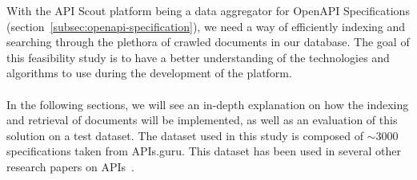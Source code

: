 With the API Scout platform being a data aggregator for OpenAPI Specifications (section~\ref{subsec:openapi-specification}), we need a way of efficiently indexing and searching through the plethora of crawled documents in our database.
The goal of this feasibility study is to have a better understanding of the technologies and algorithms to use during the development of the platform. \\ \\
In the following sections, we will see an in-depth explanation on how the indexing and retrieval of documents will be implemented, as well as an evaluation of this solution on a test dataset.
The dataset used in this study is composed of $\sim$3000 specifications taken from APIs.guru. 
This dataset has been used in several other research papers on APIs~\cite{ma_restful_2023,kim_empirical_2019,tsai_rest_2021,yasmin_first_2020,moon_api-miner_2023,yang_towards_2018,ma_api_2020}.